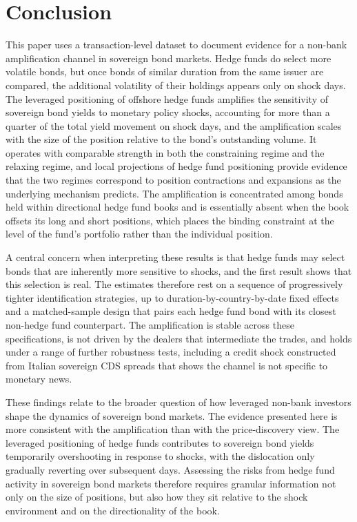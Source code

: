 \documentclass[english, 11pt, oneside]{article}
\begin{document}
\section{Conclusion}
\label{sec:conclusion}
This paper uses a transaction-level dataset to document evidence for a non-bank amplification channel in sovereign bond markets. Hedge funds do select more volatile bonds, but once bonds of similar duration from the same issuer are compared, the additional volatility of their holdings appears only on shock days. The leveraged positioning of offshore hedge funds amplifies the sensitivity of sovereign bond yields to monetary policy shocks, accounting for more than a quarter of the total yield movement on shock days, and the amplification scales with the size of the position relative to the bond's outstanding volume. It operates with comparable strength in both the constraining regime and the relaxing regime, and local projections of hedge fund positioning provide evidence that the two regimes correspond to position contractions and expansions as the underlying mechanism predicts. The amplification is concentrated among bonds held within directional hedge fund books and is essentially absent when the book offsets its long and short positions, which places the binding constraint at the level of the fund's portfolio rather than the individual position.

A central concern when interpreting these results is that hedge funds may select bonds that are inherently more sensitive to shocks, and the first result shows that this selection is real. The estimates therefore rest on a sequence of progressively tighter identification strategies, up to duration-by-country-by-date fixed effects and a matched-sample design that pairs each hedge fund bond with its closest non-hedge fund counterpart. The amplification is stable across these specifications, is not driven by the dealers that intermediate the trades, and holds under a range of further robustness tests, including a credit shock constructed from Italian sovereign CDS spreads that shows the channel is not specific to monetary news. 

These findings relate to the broader question of how leveraged non-bank investors shape the dynamics of sovereign bond markets. The evidence presented here is more consistent with the amplification than with the price-discovery view. The leveraged positioning of hedge funds contributes to sovereign bond yields temporarily overshooting in response to shocks, with the dislocation only gradually reverting over subsequent days. Assessing the risks from hedge fund activity in sovereign bond markets therefore requires granular information not only on the size of positions, but also how they sit relative to the shock environment and on the directionality of the book.
\end{document}
